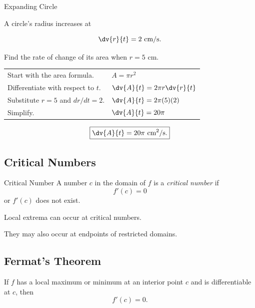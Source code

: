 \begin{workedexamplebox}{Expanding Circle}

A circle's radius increases at

\[ \dv{r}{t}=2\text{ cm/s}. \]

Find the rate of change of its area when \(r=5\) cm.

\begin{tabularx}{\textwidth}{@{}>{\raggedright\arraybackslash}p{}X@{}}
Start with the area formula. &
\(A=\pi r^2\)\\
Differentiate with respect to \(t\). &
\(\displaystyle \dv{A}{t}=2\pi r\dv{r}{t}\)\\
Substitute \(r=5\) and \(dr/dt=2\). &
\(\displaystyle \dv{A}{t}=2\pi(5)(2)\)\\
Simplify. &
\(\displaystyle \dv{A}{t}=20\pi\)
\end{tabularx}

\begin{answerbox}
\[ \boxed{\dv{A}{t}=20\pi\text{ cm}^2/\text{s}.} \]
\end{answerbox}
\end{workedexamplebox}

\subsection{Critical Numbers}
\label{subsec:critical-numbers}

\begin{definitionbox}{Critical Number}
A number \(c\) in the domain of \(f\) is a \emph{critical number} if
\[ f'(c)=0 \]
or \(f'(c)\) does not exist.
\end{definitionbox}

Local extrema can occur at critical numbers.

They may also occur at endpoints of restricted domains.

\subsection{Fermat's Theorem}
\label{subsec:fermats-theorem-calculus}

\begin{theorem}
If \(f\) has a local maximum or minimum at an interior point \(c\) and is
differentiable at \(c\), then
\[ f'(c)=0. \]
\end{theorem}

